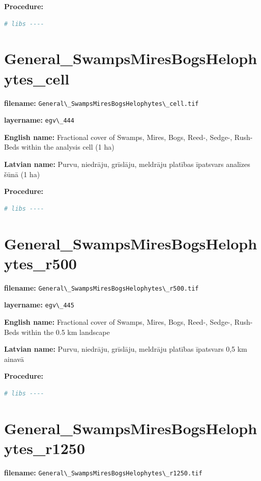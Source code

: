 \documentclass[
]{book}
\newcommand{\passthrough}[1]{#1}
\begin{document}
\textbf{Procedure:}

\begin{lstlisting}[language=R]
# libs ----
\end{lstlisting}

\section{General\_SwampsMiresBogsHelophytes\_cell}\label{ch06.444}

\textbf{filename:} \passthrough{\lstinline!General\_SwampsMiresBogsHelophytes\_cell.tif!}

\textbf{layername:} \passthrough{\lstinline!egv\_444!}

\textbf{English name:} Fractional cover of Swamps, Mires, Bogs, Reed-, Sedge-, Rush- Beds within the analysis cell (1 ha)

\textbf{Latvian name:} Purvu, niedrāju, grīslāju, meldrāju platības īpatsvars analīzes šūnā (1 ha)

\textbf{Procedure:}

\begin{lstlisting}[language=R]
# libs ----
\end{lstlisting}

\section{General\_SwampsMiresBogsHelophytes\_r500}\label{ch06.445}

\textbf{filename:} \passthrough{\lstinline!General\_SwampsMiresBogsHelophytes\_r500.tif!}

\textbf{layername:} \passthrough{\lstinline!egv\_445!}

\textbf{English name:} Fractional cover of Swamps, Mires, Bogs, Reed-, Sedge-, Rush- Beds within the 0.5 km landscape

\textbf{Latvian name:} Purvu, niedrāju, grīslāju, meldrāju platības īpatsvars 0,5 km ainavā

\textbf{Procedure:}

\begin{lstlisting}[language=R]
# libs ----
\end{lstlisting}

\section{General\_SwampsMiresBogsHelophytes\_r1250}\label{ch06.446}

\textbf{filename:} \passthrough{\lstinline!General\_SwampsMiresBogsHelophytes\_r1250.tif!}
\end{document}
